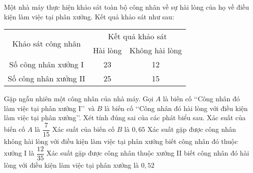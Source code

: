 \begin{ex}%
	Một nhà máy thực hiện khảo sát toàn bộ công nhân về sự hài lòng của họ về điều kiện làm việc tại phân xưởng. Kết quả khảo sát như sau:
	\begin{center}
	\begin{tabular}{|c|ccll|}
	\hline
	\multirow{2}{*}{Khảo sát công nhân} & \multicolumn{4}{c|}{Kết quả khảo sát} \\ \cline{2-5} 
	& \multicolumn{1}{c|}{Hài lòng} & \multicolumn{3}{c|}{Không hài lòng} \\ \hline
	Số công nhân xưởng I & \multicolumn{1}{c|}{23} & \multicolumn{3}{c|}{12} \\ \hline
	Số công nhân xưởng II & \multicolumn{1}{c|}{25} & \multicolumn{3}{c|}{15} \\ \hline
	\end{tabular}
	\end{center}
	Gặp ngẫu nhiên một công nhân của nhà máy. Gọi $A$ là biến cố \lq\lq  Công nhân đó làm việc tại phân xưởng I\rq\rq \, và $B$ là biến cố \lq\lq  Công nhân đó hài lòng với điều kiện làm việc tại phân xưởng\rq\rq. Xét tính đúng sai của các phát biểu sau.
	\choiceTF
	{\True Xác suất của biến cố $A$ là $\dfrac{7}{15}$}
	{Xác suất của biến cố $B$ là $0{,}65$}
	{\True Xác suất gặp được công nhân không hài lòng với điều kiện làm việc tại phân xưởng biết công nhân đó thuộc xưởng I là $\dfrac{12}{35}$}
	{Xác suất gặp được công nhân thuộc xưởng II biết công nhân đó hài lòng với điều kiện làm việc tại phân xưởng là $0{,}52$}
\end{ex}
